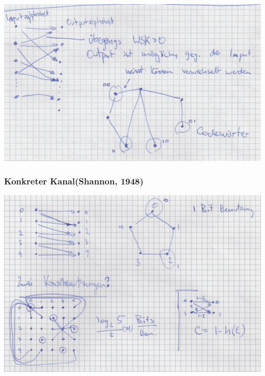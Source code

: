 \begin{bsp*}[note = Fehlerfreie Kommunikation über verrauschte Kanäle]
	\includegraphics[width=\textwidth]{Bild31}
\end{bsp*}
\subsubsection{Konkreter Kanal(Shannon, 1948)}
\includegraphics[width=\textwidth]{Bild32}

